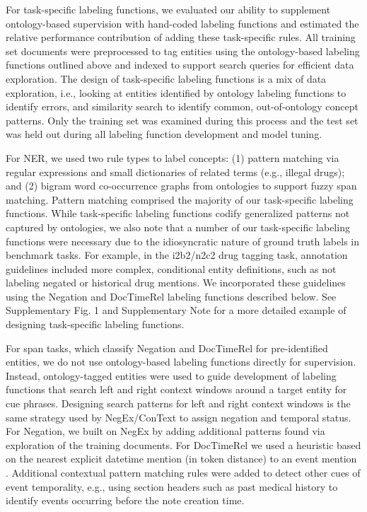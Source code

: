 \documentclass{article}
\begin{document}
{For task-specific labeling functions,} we evaluated our ability to supplement ontology-based supervision with hand-coded labeling functions and estimated the relative performance contribution of adding these task-specific rules. 
All training set documents were preprocessed to tag entities using the ontology-based labeling functions outlined above and indexed to support search queries for efficient data exploration. 
The design of task-specific labeling functions is a mix of data exploration, i.e., looking at entities identified by ontology labeling functions to identify errors, and similarity search to identify common, out-of-ontology concept patterns. 
Only the training set was examined during this process and the test set was held out during all labeling function development and model tuning.

For NER, we used two rule types to label concepts: (1) pattern matching via regular expressions and small dictionaries of related terms (e.g., illegal drugs); and (2) bigram word co-occurrence graphs from ontologies to support fuzzy span matching. 
Pattern matching comprised the majority of our task-specific labeling functions. 
While task-specific labeling functions codify generalized patterns not captured by ontologies, we also note that a number of our task-specific labeling functions were necessary due to the idiosyncratic nature of {ground truth} labels in benchmark tasks. 
For example, in the i2b2/n2c2 drug tagging task, annotation guidelines included more complex, conditional entity definitions, such as not labeling negated or historical drug mentions. 
We incorporated these guidelines using the Negation and DocTimeRel labeling functions described below.
See Supplementary Fig. 1 and Supplementary {Note} for a more detailed example of designing task-specific labeling functions.


For span tasks, which classify Negation and DocTimeRel for pre-identified entities, we do not use ontology-based labeling functions directly for supervision.
Instead, ontology-tagged entities were used to guide development of labeling functions that search left and right context windows around a target entity for cue phrases.
Designing search patterns for left and right context windows is the same strategy used by NegEx/ConText \cite{Chapman2001-or,harkema2009context} to assign negation and temporal status.
For Negation, we built on NegEx by adding additional patterns found via exploration of the training documents.
For DocTimeRel we used a heuristic based on the nearest explicit datetime mention (in token distance) to an event mention \cite{Fries2016-ei}.  
Additional contextual pattern matching rules were added to detect other cues of event temporality, e.g., using section headers such as {past medical history} to identify events occurring before the note creation time.
\end{document}
